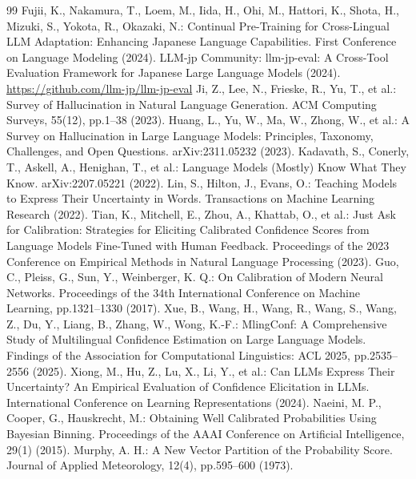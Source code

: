 \begin{thebibliography}{99}
 Fujii, K., Nakamura, T., Loem, M., Iida, H., Ohi, M., Hattori, K., Shota, H., Mizuki, S., Yokota, R., Okazaki, N.: Continual Pre-Training for Cross-Lingual LLM Adaptation: Enhancing Japanese Language Capabilities. First Conference on Language Modeling (2024).
 LLM-jp Community: llm-jp-eval: A Cross-Tool Evaluation Framework for Japanese Large Language Models (2024). \url{https://github.com/llm-jp/llm-jp-eval}
 Ji, Z., Lee, N., Frieske, R., Yu, T., et al.: Survey of Hallucination in Natural Language Generation. ACM Computing Surveys, 55(12), pp.1--38 (2023).
 Huang, L., Yu, W., Ma, W., Zhong, W., et al.: A Survey on Hallucination in Large Language Models: Principles, Taxonomy, Challenges, and Open Questions. arXiv:2311.05232 (2023).
 Kadavath, S., Conerly, T., Askell, A., Henighan, T., et al.: Language Models (Mostly) Know What They Know. arXiv:2207.05221 (2022).
 Lin, S., Hilton, J., Evans, O.: Teaching Models to Express Their Uncertainty in Words. Transactions on Machine Learning Research (2022).
 Tian, K., Mitchell, E., Zhou, A., Khattab, O., et al.: Just Ask for Calibration: Strategies for Eliciting Calibrated Confidence Scores from Language Models Fine-Tuned with Human Feedback. Proceedings of the 2023 Conference on Empirical Methods in Natural Language Processing (2023).
 Guo, C., Pleiss, G., Sun, Y., Weinberger, K. Q.: On Calibration of Modern Neural Networks. Proceedings of the 34th International Conference on Machine Learning, pp.1321--1330 (2017).
 Xue, B., Wang, H., Wang, R., Wang, S., Wang, Z., Du, Y., Liang, B., Zhang, W., Wong, K.-F.: MlingConf: A Comprehensive Study of Multilingual Confidence Estimation on Large Language Models. Findings of the Association for Computational Linguistics: ACL 2025, pp.2535--2556 (2025).
 Xiong, M., Hu, Z., Lu, X., Li, Y., et al.: Can LLMs Express Their Uncertainty? An Empirical Evaluation of Confidence Elicitation in LLMs. International Conference on Learning Representations (2024).
 Naeini, M. P., Cooper, G., Hauskrecht, M.: Obtaining Well Calibrated Probabilities Using Bayesian Binning. Proceedings of the AAAI Conference on Artificial Intelligence, 29(1) (2015).
 Murphy, A. H.: A New Vector Partition of the Probability Score. Journal of Applied Meteorology, 12(4), pp.595--600 (1973).

\end{thebibliography}
